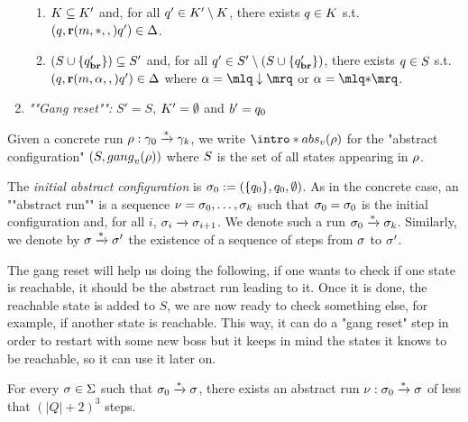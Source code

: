 \begin{definition}
\begin{enumerate}
\begin{enumerate}[i]
		\item\label{item:external_broadcast_clique}$\clique \subseteq \clique'$ and, for all $q' \in \clique' \setminus \clique$, there exists $q \in \clique$ s.t. $(q, \textbf{r}(m, {*}, ,) q') \in \Delta$.
		
		\item\label{item:external_broadcast_covset}$(S \cup \{q_{\textbf{br}}'\}) \subseteq S'$ and, for all $q' \in S' \setminus (S \cup \{q_{\textbf{br}}'\})$, there exists $q \in S$ s.t. $(q, \textbf{r}(m, \alpha, ,) q') \in \Delta$ where $\anact = \quotemarks{\enregact}$ or $\anact = \quotemarks{\dummyact}$.
	\end{enumerate}
	\item \emph{""Gang reset"":} $S' = S$, $\clique' = \emptyset$ and $\boss'= q_0$
\end{enumerate}


Given a concrete run $\rho: \gamma_0 \xrightarrow{*} \gamma_k$, we write \AP  $\intro*\absproj{\aval}{\run}$ for the "abstract configuration" $(\covset, \gangof{\aval}{\run})$ where $S$ is the set of all states appearing in $\rho$. 

The \emph{initial abstract configuration} is $\sigma_0 := (\{q_0\}, q_0, \emptyset)$. 
As in the concrete case, an ""abstract run"" is a sequence $\nu = \sigma_0, \dots, \sigma_k$ such that $\sigma_0 = \sigma_0$ is the initial configuration and, for all $i$, $\sigma_i \xrightarrow{} \sigma_{i+1}$. We denote such a run $\sigma_0 \xrightarrow{*} \sigma_k$. Similarly, we denote by $\sigma \xrightarrow{*} \sigma'$ the existence of a sequence of steps from $\sigma$ to $\sigma'$.
\end{definition}

The gang reset will help us doing the following, if one wants to check if one state is reachable, it should be the abstract run leading to it. Once it is done, the reachable state is added to $S$, we are now ready to check something else, for example, if another state is reachable. This way, it can do a "gang reset" step in order to restart with some new boss but it keeps in mind the states it knows to be reachable, so it can use it later on. 

\begin{lemma}
	\label{lem:short-run}
For every $\sigma \in \Sigma$ such that $\sigma_0 \xrightarrow{*} \sigma$, there exists an abstract run $\nu: \sigma_0 \xrightarrow{*} \sigma$ of less that $(|Q|+2)^3$ steps.
\end{lemma}

